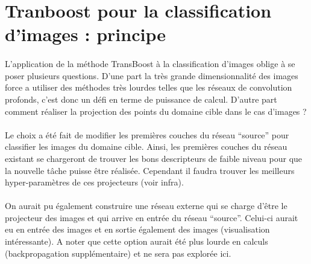 \documentclass[11 pt]{article}
\begin{document}
\section{Tranboost pour la classification d'images : principe}

\paragraph{}L’application de la méthode TransBoost à la classification d’images oblige à se poser plusieurs questions. D’une part la très grande dimensionnalité des images force a utiliser des méthodes très lourdes telles que les réseaux de convolution profonds, c'est donc un défi en terme de puissance de calcul. D’autre part comment réaliser la projection des points du domaine cible dans le cas d'images ?  


\paragraph{} Le choix a été fait de modifier les premières couches du réseau ``source'' pour classifier les images du domaine cible. Ainsi, les premières couches du réseau existant se chargeront de trouver les bons descripteurs de faible niveau pour que la nouvelle tâche puisse être réalisée. Cependant il faudra trouver les meilleurs hyper-paramètres de ces projecteurs (voir infra). 

\paragraph{} On aurait pu également construire une réseau externe qui se charge d'être le projecteur des images et qui arrive en entrée du réseau ``source''. Celui-ci aurait eu en entrée des images et en sortie également des images (visualisation intéressante). A noter que cette option aurait été plus lourde en calculs (backpropagation supplémentaire) et ne sera pas explorée ici. 
\end{document}
